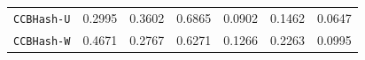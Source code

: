 \begin{table}[tp]
{\begin{tabular}{lcccccc}
\texttt{CCBHash-U} & {\cellcolor[HTML]{E1D8AA}} \color[HTML]{000000} 0.2995 & {\cellcolor[HTML]{E6E3B1}} \color[HTML]{000000} 0.3602 & {\cellcolor[HTML]{FFFFFF}} \color[HTML]{000000} 0.6865 & {\cellcolor[HTML]{CB9C8C}} \color[HTML]{F1F1F1} 0.0902 & {\cellcolor[HTML]{D4B699}} \color[HTML]{000000} 0.1462 & {\cellcolor[HTML]{B67676}} \color[HTML]{F1F1F1} 0.0647 \\
\texttt{CCBHash-W} & {\cellcolor[HTML]{EEEECA}} \color[HTML]{000000} 0.4671 & {\cellcolor[HTML]{DFD3A8}} \color[HTML]{000000} 0.2767 & {\cellcolor[HTML]{FBFBF2}} \color[HTML]{000000} 0.6271 & {\cellcolor[HTML]{D2B296}} \color[HTML]{000000} 0.1266 & {\cellcolor[HTML]{DBC8A2}} \color[HTML]{000000} 0.2263 & {\cellcolor[HTML]{D0AA92}} \color[HTML]{000000} 0.0995 \\
\bottomrule
\end{tabular}
}%
\end{table}
